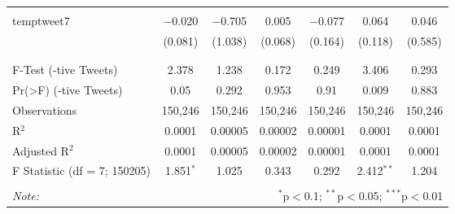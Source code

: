 \begin{table}[!htbp]
\begin{tabular}{@{\extracolsep{5pt}}lcccccc}
  & & & & & & \\ 
 temptweet7 & $-$0.020 & $-$0.705 & 0.005 & $-$0.077 & 0.064 & 0.046 \\ 
  & (0.081) & (1.038) & (0.068) & (0.164) & (0.118) & (0.585) \\ 
  & & & & & & \\ 
\hline \\[-1.8ex] 
F-Test (-tive Tweets) & 2.378 & 1.238 & 0.172 & 0.249 & 3.406 & 0.293 \\ 
Pr(>F) (-tive Tweets) & 0.05 & 0.292 & 0.953 & 0.91 & 0.009 & 0.883 \\ 
Observations & 150,246 & 150,246 & 150,246 & 150,246 & 150,246 & 150,246 \\ 
R$^{2}$ & 0.0001 & 0.00005 & 0.00002 & 0.00001 & 0.0001 & 0.0001 \\ 
Adjusted R$^{2}$ & 0.0001 & 0.00005 & 0.00002 & 0.00001 & 0.0001 & 0.0001 \\ 
F Statistic (df = 7; 150205) & 1.851$^{*}$ & 1.025 & 0.343 & 0.292 & 2.412$^{**}$ & 1.204 \\ 
\hline 
\hline \\[-1.8ex] 
\textit{Note:}  & \multicolumn{6}{r}{$^{*}$p$<$0.1; $^{**}$p$<$0.05; $^{***}$p$<$0.01} \\ 
\end{tabular} 
\end{table} 

